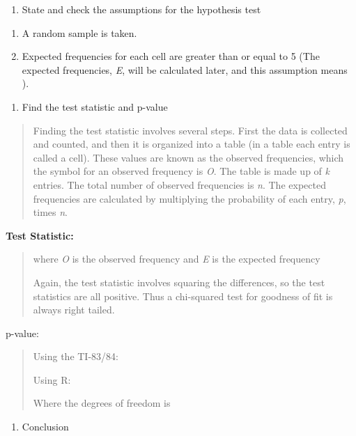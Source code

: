 \documentclass[]{book}
\providecommand{\tightlist}{%
  \setlength{\itemsep}{0pt}\setlength{\parskip}{0pt}}
\begin{document}
\begin{enumerate}
\def\labelenumi{\arabic{enumi}.}
\setcounter{enumi}{1}
\tightlist
\item
  State and check the assumptions for the hypothesis test
\end{enumerate}

\begin{enumerate}
\def\labelenumi{\alph{enumi}.}
\item
  A random sample is taken.
\item
  Expected frequencies for each cell are greater than or equal to 5 (The expected frequencies, \emph{E}, will be calculated later, and this assumption means ).
\end{enumerate}

\begin{enumerate}
\def\labelenumi{\arabic{enumi}.}
\setcounter{enumi}{2}
\tightlist
\item
  Find the test statistic and p-value
\end{enumerate}

\begin{quote}
Finding the test statistic involves several steps. First the data is collected and counted, and then it is organized into a table (in a table each entry is called a cell). These values are known as the observed frequencies, which the symbol for an observed frequency is \emph{O}. The table is made up of \emph{k} entries. The total number of observed frequencies is \emph{n}. The expected frequencies are calculated by multiplying the probability of each entry, \emph{p}, times \emph{n}.
\end{quote}

\textbf{Test Statistic:}

\begin{quote}
where \emph{O} is the observed frequency and \emph{E} is the expected frequency

Again, the test statistic involves squaring the differences, so the test statistics are all positive. Thus a chi-squared test for goodness of fit is always right tailed.
\end{quote}

p-value:

\begin{quote}
Using the TI-83/84:

Using R:

Where the degrees of freedom is
\end{quote}

\begin{enumerate}
\def\labelenumi{\arabic{enumi}.}
\setcounter{enumi}{3}
\tightlist
\item
  Conclusion
\end{enumerate}
\end{document}
